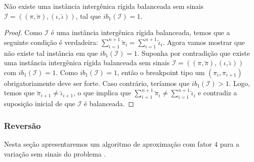 \begin{lemma}\label{lemma:WSPRPLAH}
Não existe uma instância intergênica rígida balanceada sem sinais $\mathcal{I}=((\pi,\breve\pi),(\iota,\breve\iota))$, tal que $ib_1(\mathcal{I}) = 1$.
\end{lemma}
\begin{proof}
Como $\mathcal{I}$ é uma instância intergênica rígida balanceada, temos que a seguinte condição é verdadeira: $\sum_{i=1}^{n+1}\breve\pi_i = \sum_{i=1}^{n+1}\breve\iota_i$. Agora vamos mostrar que não existe tal instância em que $ib_1(\mathcal{I}) = 1$. Suponha por contradição que existe uma instância intergênica rígida balanceada sem sinais $\mathcal{I}=((\pi,\breve\pi),(\iota,\breve\iota))$ com $ib_1(\mathcal{I}) = 1$. Como $ib_1(\mathcal{I}) = 1$, então o breakpoint tipo um $(\pi_i,\pi_{i+1})$ obrigatoriamente deve ser forte. Caso contrário, teríamos que $ib_1(\mathcal{I}) > 1$. Logo, temos que $\breve\pi_{i+1} \ne \breve\iota_{i+1}$, o que implica que $\sum_{i=1}^{n+1}\breve\pi_i \ne \sum_{i=1}^{n+1}\breve\iota_i$ e contradiz a suposição inicial de que $\mathcal{I}$ é balanceada.
\end{proof}


\subsubsection{Reversão}

Nesta seção apresentaremos um algoritmo de aproximação com fator $4$ para a variação sem sinais do problema \SbIR{}.

